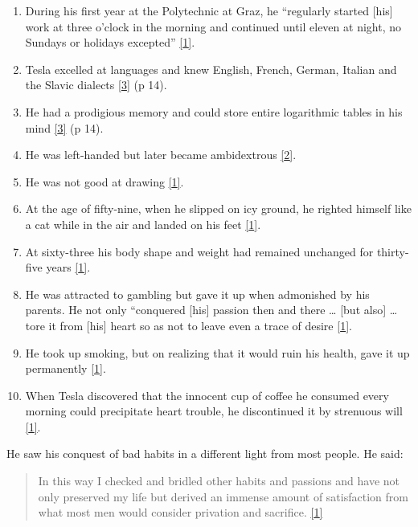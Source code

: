 \documentclass[
  12pt,
  british,
  a4paper,
  rgb,
  dvipsnames,
  svgnames,
  hyphens]{article}
\providecommand{\tightlist}{%
  \setlength{\itemsep}{0pt}\setlength{\parskip}{0pt}}
\begin{document}
\begin{enumerate}
\tightlist
\item
  During his first year at the Polytechnic at Graz, he ``regularly
  started {[}his{]} work at three o'clock in the morning and continued
  until eleven at night, no Sundays or holidays excepted''
  \protect\hyperlink{ref-john83}{{[}1{]}}.
\item
  Tesla excelled at languages and knew English, French, German, Italian
  and the Slavic dialects \protect\hyperlink{ref-cheney81}{{[}3{]}} (p
  14).
\item
  He had a prodigious memory and could store entire logarithmic tables
  in his mind \protect\hyperlink{ref-cheney81}{{[}3{]}} (p 14).
\item
  He was left-handed but later became ambidextrous
  \protect\hyperlink{ref-oneill80}{{[}2{]}}.
\item
  He was not good at drawing \protect\hyperlink{ref-john83}{{[}1{]}}.
\item
  At the age of fifty-nine, when he slipped on icy ground, he righted
  himself like a cat while in the air and landed on his feet
  \protect\hyperlink{ref-john83}{{[}1{]}}.
\item
  At sixty-three his body shape and weight had remained unchanged for
  thirty-five years \protect\hyperlink{ref-john83}{{[}1{]}}.
\item
  He was attracted to gambling but gave it up when admonished by his
  parents. He not only ``conquered {[}his{]} passion then and there
  \ldots{} {[}but also{]} \ldots{} tore it from {[}his{]} heart so as
  not to leave even a trace of desire
  \protect\hyperlink{ref-john83}{{[}1{]}}.
\item
  He took up smoking, but on realizing that it would ruin his health,
  gave it up permanently \protect\hyperlink{ref-john83}{{[}1{]}}.
\item
  When Tesla discovered that the innocent cup of coffee he consumed
  every morning could precipitate heart trouble, he discontinued it by
  strenuous will \protect\hyperlink{ref-john83}{{[}1{]}}.
\end{enumerate}

He saw his conquest of bad habits in a different light from most people.
He said:

\begin{quote}
In this way I checked and bridled other habits and passions and have not
only preserved my life but derived an immense amount of satisfaction
from what most men would consider privation and sacrifice.
\protect\hyperlink{ref-john83}{{[}1{]}}
\end{quote}
\end{document}
